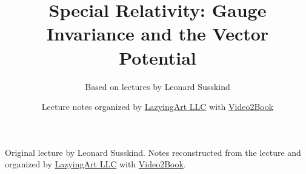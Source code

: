 \documentclass[11pt,oneside]{book}
\begin{document}
\frontmatter
\title{Special Relativity: Gauge Invariance and the Vector Potential}
\author{Based on lectures by Leonard Susskind}
\date{Lecture notes organized by \href{https://lazying.art}{LazyingArt LLC} with \href{https://github.com/lachlanchen/Video2Book}{Video2Book}}
\maketitle
\begin{center}
\small Original lecture by Leonard Susskind. Notes reconstructed from the lecture and organized by \href{https://lazying.art}{LazyingArt LLC} with \href{https://github.com/lachlanchen/Video2Book}{Video2Book}.
\end{center}
\clearpage
\mainmatter

\end{document}
